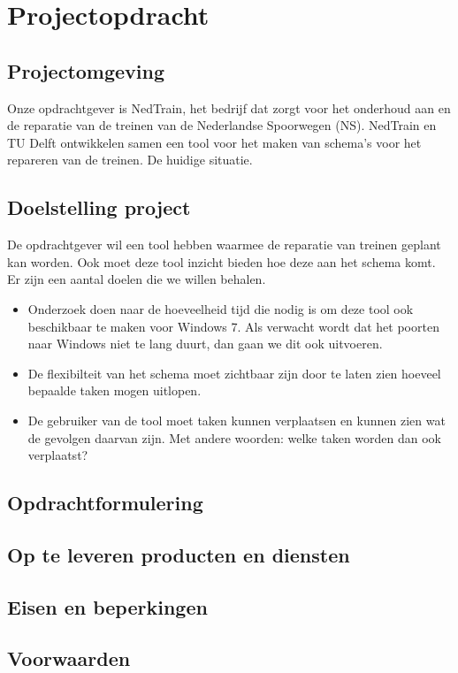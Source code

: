 \section{Projectopdracht}
\subsection{Projectomgeving}
Onze opdrachtgever is NedTrain, het bedrijf dat zorgt voor het onderhoud aan en de reparatie van de treinen van de Nederlandse Spoorwegen (NS). NedTrain en TU Delft ontwikkelen samen een tool voor het maken van schema's voor het repareren van de treinen. 
De huidige situatie. 
\subsection{Doelstelling project}
De opdrachtgever wil een tool hebben waarmee de reparatie van treinen geplant kan worden. Ook moet deze tool inzicht bieden hoe deze aan het schema komt. 
Er zijn een aantal doelen die we willen behalen.
\begin{itemize}
	\item Onderzoek doen naar de hoeveelheid tijd die nodig is om deze tool ook beschikbaar te maken voor Windows 7. Als verwacht wordt dat het poorten naar Windows niet te lang duurt, dan gaan we dit ook uitvoeren. 
	\item De flexibilteit van het schema moet zichtbaar zijn door te laten zien hoeveel bepaalde taken mogen uitlopen. 
	\item De gebruiker van de tool moet taken kunnen verplaatsen en kunnen zien wat de gevolgen daarvan zijn. Met andere woorden: welke taken worden dan ook verplaatst?
\end{itemize}
\subsection{Opdrachtformulering}
\subsection{Op te leveren producten en diensten}
\subsection{Eisen en beperkingen}
\subsection{Voorwaarden}

